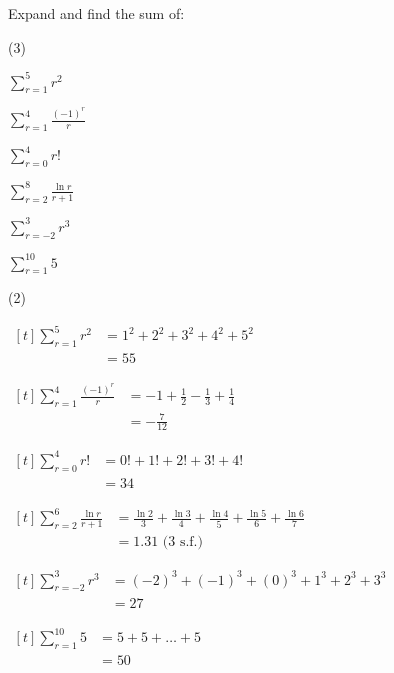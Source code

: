 \documentclass[11pt,a4paper]{book}
\begin{document}
\begin{example}

Expand and find the sum of:

\begin{tasks}[label=(\alph*),label-width=3.5ex](3)

\task  ${\displaystyle \sum_{r=1}^{5}r^{2}}$

\task  ${\displaystyle \sum_{r=1}^{4}\frac{\left(-1\right)^{r}}{r}}$

\task  ${\displaystyle \sum_{r=0}^{4}r!}$

\task  ${\displaystyle \sum_{r=2}^{8}\frac{\ln r}{r+1}}$

\task  ${\displaystyle \sum_{r=-2}^{3}r^{3}}$

\task  ${\displaystyle \sum_{r=1}^{10}5}$

\end{tasks}

\Solution

\begin{tasks}[label=(\alph*),label-width=3.5ex](2)

\task
$
\begin{aligned}[t]
\sum_{r=1}^{5}r^{2} & =1^{2}+2^{2}+3^{2}+4^{2}+5^{2}\\
 & =55
\end{aligned}
$


\task
$
\begin{aligned}[t]
\sum_{r=1}^{4}\frac{\left(-1\right)^{r}}{r} & =-1+\frac{1}{2}-\frac{1}{3}+\frac{1}{4}\\
 & =-\frac{7}{12}
\end{aligned}
$


\task
$
\begin{aligned}[t]
\sum_{r=0}^{4}r! & =0!+1!+2!+3!+4!\\
 & =34
\end{aligned}
$

\task
$
\begin{aligned}[t]
\sum_{r=2}^{6}\frac{\ln r}{r+1} & =\frac{\ln2}{3}+\frac{\ln3}{4}+\frac{\ln4}{5}+\frac{\ln5}{6}+\frac{\ln6}{7}\\
 & =1.31\text{ (3 s.f.)}
\end{aligned}
$

\task
$
\begin{aligned}[t]
{\displaystyle \sum_{r=-2}^{3}r^{3}} & =\left(-2\right)^{3}+\left(-1\right)^{3}+\left(0\right)^{3}+1^{3}+2^{3}+3^{3}\\
 & =27
\end{aligned}
$

\task
$
\begin{aligned}[t]
\sum_{r=1}^{10}5 & =5+5+\ldots+5\\
 & =50
\end{aligned}
$

\end{tasks}

\end{example}
\end{document}
